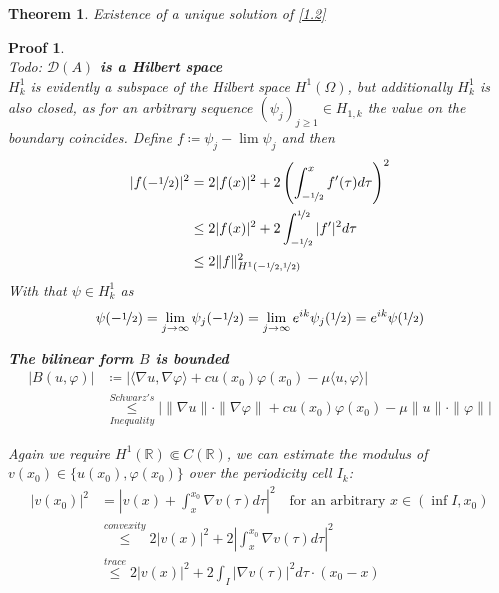 \documentclass[14pt,a4paper]{scrartcl}
\newtheorem{theorem}[Satz]{Theorem}
\newtheorem*{proof*}{Proof}
\numberwithin{equation}{section}
\newcommand{\R}{\mathbb{R}}
\begin{document}
	\begin{theorem} Existence of a unique solution of \ref{1.2} \end{theorem}
	\begin{proof*} ~\\
		Todo: \textbf{$\mathcal{D}(A)$ is a Hilbert space} \\
		$H^{1}_{k}$ is evidently a subspace of the Hilbert space $H^{1}(\Omega)$, but additionally $H^{1}_{k}$ is also closed, as for an arbitrary sequence $(\psi_{j})_{j \geq 1} \in H_{1, k}$ the value on the boundary coincides. Define $f \coloneqq \psi_{j} - \lim \psi_{j}$ and then
		\begin{align*}
			| f(-\nicefrac{1}{2}) |^{2} & = 2 | f(x) |^{2} + 2 \left( \int_{-\nicefrac{1}{2}}^{x} f'(\tau) d\tau \right)^{2} \\
				& \leq 2 |f(x)|^{2} + 2 \int_{- \nicefrac{1}{2}}^{\nicefrac{1}{2}} |f'|^{2} d\tau \\
				& \leq 2 \| f \|^{2}_{H^{1}(-\nicefrac{1}{2}, \nicefrac{1}{2})}
		\end{align*}
		With that $\psi \in H^{1}_{k}$ as
		\[ \psi(-\nicefrac{1}{2}) = \lim_{j \rightarrow \infty} \psi_{j}(-\nicefrac{1}{2}) = \lim_{j \rightarrow \infty} e^{ik} \psi_{j}(\nicefrac{1}{2}) = e^{ik} \psi(\nicefrac{1}{2}) \]

		\textbf{The bilinear form $B$ is bounded}
		\begin{align*} 
			| B(u, \varphi)| & \coloneqq \left| \langle \nabla u, \nabla \varphi \rangle + c u(x_{0}) \varphi(x_{0}) - \mu \langle u , \varphi \rangle  \right|\\
				& \overset{Schwarz's}{\underset{Inequality}{\leq}} \big| \| \nabla u \| \cdot \| \nabla \varphi \| + c u(x_{0}) \varphi(x_{0}) - \mu \| u \| \cdot \| \varphi\| \big|	
		\end{align*}

		Again we require $H^{1}(\R) \Subset C(\R)$, we can estimate the modulus of $v(x_{0}) \in \{ u(x_{0}), \varphi(x_{0}) \}$ over the periodicity cell $I_{k}$: 
		\begin{align*}
			|v(x_{0})|^{2} & = \left| v(x) + \int_{x}^{x_{0}} \nabla v( \tau ) d\tau \right|^{2} \quad \text{for an arbitrary } x \in ( \inf I, x_{0}) \\
				& \overset{convexity}{\leq} 2 |v(x)|^{2} + 2 \left| \int_{x}^{x_{0}} \nabla v(\tau) d\tau \right|^{2} \\
				& \overset{trace}{\leq}	2 |v(x)|^{2} + 2 \int_{I} \left| \nabla v(\tau) \right|^{2} d\tau \cdot(x_{0} - x)
		\end{align*}


\end{proof*}
\end{document}
